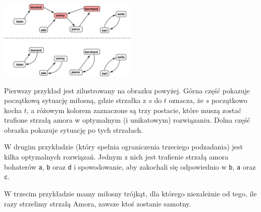 \section*{\sampleexplanations}

\begin{center}
\includegraphics[width=0.5\textwidth]{polygonfig.pdf}
\end{center}

Pierwszy przykład jest zilustrowany na obrazku powyżej. Górna część pokazuje początkową sytuację miłosną,
gdzie strzałka z $s$ do $t$ oznacza, że $s$ początkowo kocha $t$, a różowym kolorem zaznaczone są
trzy postacie, które muszą zostać trafione strzałą amora w optymalnym (i unikatowym) rozwiązaniu.
Dolna część obrazka pokazuje sytuację po tych strzałach.

W drugim przykładzie (który spełnia ograniczenia trzeciego podzadania) jest kilka optymalnych rozwiązań.
Jednym z nich jest trafienie strzałą amora bohaterów \texttt{a}, \texttt{b} oraz \texttt{d} i spowodowanie, aby
zakochali się odpowiednio w \texttt{b}, \texttt{a} oraz \texttt{c}.

W trzecim przykładzie mamy miłosny trójkąt, dla którego niezależnie od tego, ile razy strzelimy strzałą Amora, zawsze ktoś zostanie samotny.
